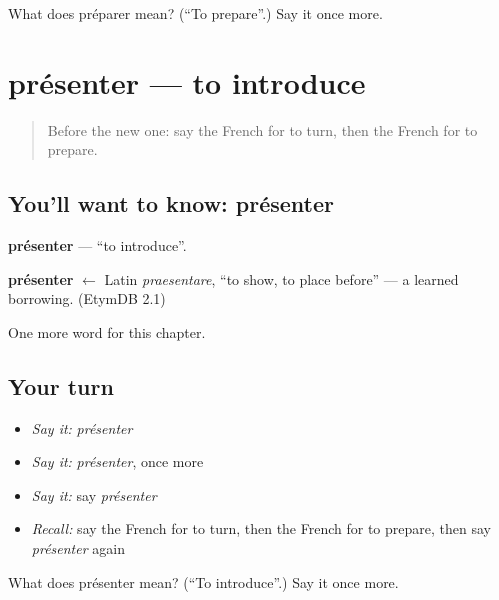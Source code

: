 \begin{tcolorbox}[breakable,colback=teal!4,colframe=teal!35!black,title={Before you move on}]
What does préparer mean? (\textquotedblleft{}To prepare\textquotedblright{}.) Say it once more.
\end{tcolorbox}
\section[présenter]{présenter — to introduce}

\label{lesson:FR-C180-presenter}



\begin{quote}
Before the new one: say the French for to turn, then the French for to prepare.
\end{quote}

\subsection*{You'll want to know: présenter}
\textbf{présenter} — \textquotedblleft{}to introduce\textquotedblright{}.

\begin{cousinweb}
\textbf{présenter} $\leftarrow$ Latin \emph{praesentare}, \textquotedblleft{}to show, to place before\textquotedblright{} — a learned borrowing. (EtymDB 2.1)
\end{cousinweb}

\begin{grammarlens}[title={What you've built}]
One more word for this chapter.
\end{grammarlens}

\subsection*{Your turn}
\begin{itemize}
\raggedright
  \item \emph{Say it:} \emph{présenter}
  \item \emph{Say it:} \emph{présenter}, once more
  \item \emph{Say it:} say \emph{présenter}
  \item \emph{Recall:} say the French for to turn, then the French for to prepare, then say \emph{présenter} again
\end{itemize}

\begin{tcolorbox}[breakable,colback=teal!4,colframe=teal!35!black,title={Before you move on}]
What does présenter mean? (\textquotedblleft{}To introduce\textquotedblright{}.) Say it once more.
\end{tcolorbox}
